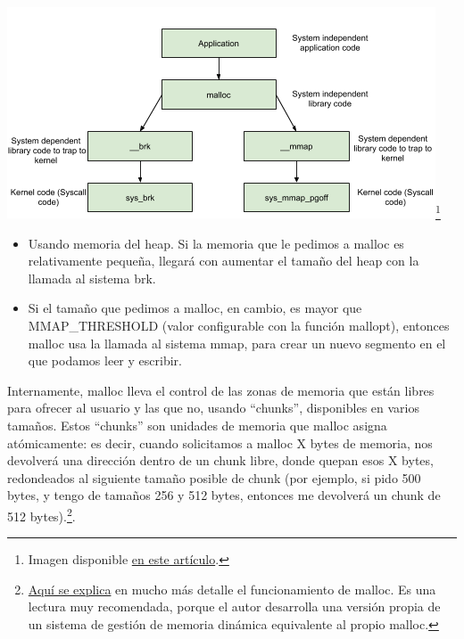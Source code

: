 \documentclass[a4paper]{article}
\begin{document}
\begin{center}
    \includegraphics[scale=0.7]{malloc.png}\footnote{Imagen disponible \href{https://sploitfun.wordpress.com/2015/02/11/syscalls-used-by-malloc/}{en este artículo}.}
\end{center}


\begin{itemize}
    \item Usando memoria del {\ttfamily heap}. Si la memoria que le pedimos a {\ttfamily malloc} es relativamente pequeña, llegará con aumentar el tamaño del {\ttfamily heap} con la llamada al sistema {\ttfamily brk}.
    \item Si el tamaño que pedimos a {\ttfamily malloc}, en cambio, es mayor que {\ttfamily MMAP\_THRESHOLD} (valor configurable con la función {\ttfamily mallopt}), entonces {\ttfamily malloc} usa la llamada al sistema {\ttfamily mmap}, para crear un nuevo segmento en el que podamos leer y escribir.
\end{itemize}

Internamente, {\ttfamily malloc} lleva el control de las zonas de memoria que están libres para ofrecer al usuario y las que no, usando ``chunks'', disponibles en varios tamaños. Estos ``chunks'' son unidades de memoria que {\ttfamily malloc} asigna atómicamente: es decir, cuando solicitamos a {\ttfamily malloc} X bytes de memoria, nos devolverá una dirección dentro de un chunk libre, donde quepan esos X bytes, redondeados al siguiente tamaño posible de chunk (por ejemplo, si pido 500 bytes, y tengo de tamaños 256 y 512 bytes, entonces me devolverá un chunk de 512 bytes).\footnote{\href{https://danluu.com/malloc-tutorial/}{Aquí se explica} en mucho más detalle el funcionamiento de {\ttfamily malloc}. Es una lectura muy recomendada, porque el autor desarrolla una versión propia de un sistema de gestión de memoria dinámica equivalente al propio {\ttfamily malloc}.}.
\end{document}
